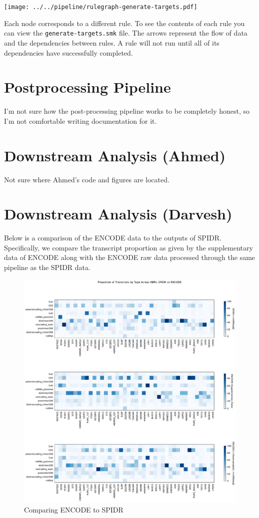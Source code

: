 \documentclass{article}
\begin{document}
    \begin{center}
        \texttt{[image: ../../pipeline/rulegraph-generate-targets.pdf]}
    \end{center}

    \noindent Each node corresponds to a different rule. To see the contents of each rule you can view the \texttt{generate-targets.smk} file. The arrows represent the flow of data and the dependencies between rules. A rule will not run until all of its dependencies have successfully completed.

    \section{Postprocessing Pipeline}
    I'm not sure how the post-processing pipeline works to be completely honest, so I'm not comfortable writing documentation for it.

    \section{Downstream Analysis (Ahmed)}
    Not sure where Ahmed's code and figures are located.

    \section{Downstream Analysis (Darvesh)}
    Below is a comparison of the ENCODE data to the outputs of SPIDR. Specifically, we compare the transcript proportion as given by the supplementary data of ENCODE along with the ENCODE raw data processed through the same pipeline as the SPIDR data.
    \begin{figure}[ht]
        \centering
        \includegraphics[scale=0.4]{../../figures/heatmap_spidr_vs_encode_miRNAadj.pdf}
        \caption[short]{Comparing ENCODE to SPIDR }
    \end{figure}
    
\end{document}
